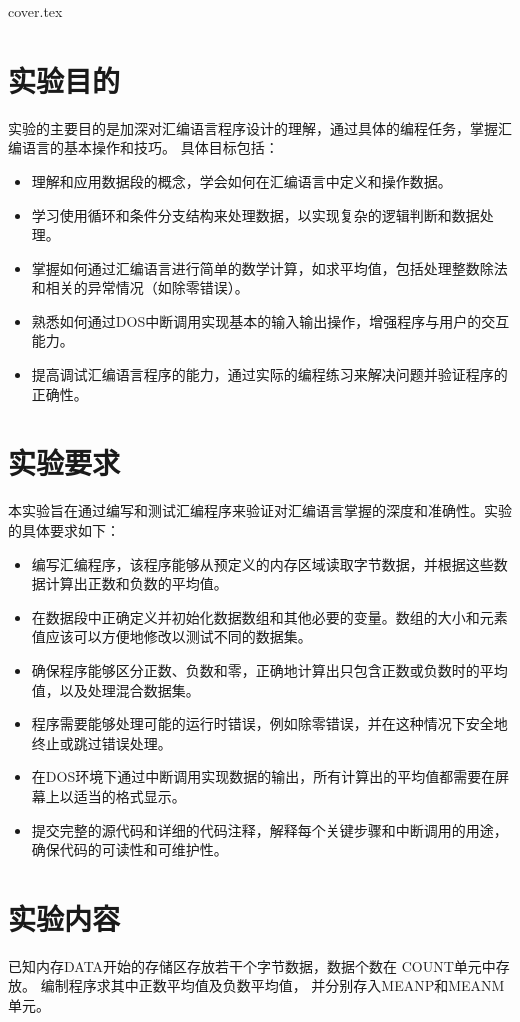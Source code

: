 \documentclass[12pt]{article}
\begin{document}
 {cover.tex}
\section{实验目的}
实验的主要目的是加深对汇编语言程序设计的理解，通过具体的编程任务，掌握汇编语言的基本操作和技巧。
具体目标包括：
\begin{itemize}
    \item 理解和应用数据段的概念，学会如何在汇编语言中定义和操作数据。
    \item 学习使用循环和条件分支结构来处理数据，以实现复杂的逻辑判断和数据处理。
    \item 掌握如何通过汇编语言进行简单的数学计算，如求平均值，包括处理整数除法和相关的异常情况（如除零错误）。
    \item 熟悉如何通过DOS中断调用实现基本的输入输出操作，增强程序与用户的交互能力。
    \item 提高调试汇编语言程序的能力，通过实际的编程练习来解决问题并验证程序的正确性。
\end{itemize}

\section{实验要求}
本实验旨在通过编写和测试汇编程序来验证对汇编语言掌握的深度和准确性。实验的具体要求如下：
\begin{itemize}
    \item 编写汇编程序，该程序能够从预定义的内存区域读取字节数据，并根据这些数据计算出正数和负数的平均值。
    \item 在数据段中正确定义并初始化数据数组和其他必要的变量。数组的大小和元素值应该可以方便地修改以测试不同的数据集。
    \item 确保程序能够区分正数、负数和零，正确地计算出只包含正数或负数时的平均值，以及处理混合数据集。
    \item 程序需要能够处理可能的运行时错误，例如除零错误，并在这种情况下安全地终止或跳过错误处理。
    \item 在DOS环境下通过中断调用实现数据的输出，所有计算出的平均值都需要在屏幕上以适当的格式显示。
    \item 提交完整的源代码和详细的代码注释，解释每个关键步骤和中断调用的用途，确保代码的可读性和可维护性。
\end{itemize}

\section{实验内容}
已知内存DATA开始的存储区存放若干个字节数据，数据个数在 COUNT单元中存放。
编制程序求其中正数平均值及负数平均值， 并分别存入MEANP和MEANM单元。
\end{document}
